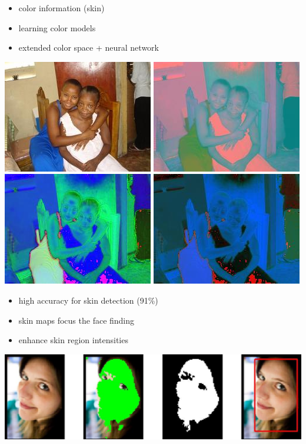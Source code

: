 \begin{xpsectionbox}{}{}
\begin{minipage}{0.5\linewidth}
\begin{itemize}
	  \item color information (skin) 
	  \item learning color models
	  \item extended color space + neural network
\end{itemize}
\begin{center}
			\includegraphics[height=0.16\linewidth]{images/Lena_RGB}
			\includegraphics[height=0.16\linewidth]{images/Lena_LAB}
			\includegraphics[height=0.16\linewidth]{images/Lena_HSV}
			\includegraphics[height=0.16\linewidth]{images/Lena_LUV}
\end{center}

{\vspace*{0.2cm}\noindent\hspace*{0.2cm}{\bf\Titlesize Advantages}\newline}{\vspace{-0.75cm}}

\begin{itemize}
	  \item high accuracy for skin detection (91\%)  
	  \item skin maps focus the face finding
	  \item enhance skin region intensities
\end{itemize}
\begin{center}
			
			\includegraphics[height=0.2\linewidth]{images/skin_color_demo}
\end{center}
\end{minipage}
\end{xpsectionbox}

